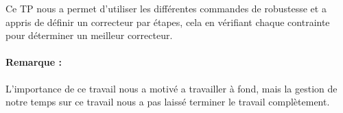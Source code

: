 \documentclass[12pt, a4paper, openany]{report}
\begin{document}
Ce TP nous a permet d'utiliser les différentes commandes de robustesse et a appris de définir un correcteur par étapes, cela en vérifiant chaque contrainte pour déterminer un meilleur correcteur.\\

\paragraph{Remarque :}
 L’importance de ce travail nous a motivé a travailler à fond, mais la gestion de notre temps sur ce travail nous a pas laissé terminer le travail complètement.








 







%
%
\end{document}
